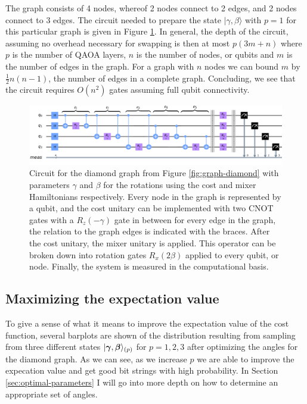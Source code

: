 The graph consists of 4 nodes, whereof 2 nodes connect to 2 edges, and 2 nodes connect to 3 edges. The circuit needed to prepare the state $|\gamma,\beta \rangle$ with $p=1$ for this particular graph is given in Figure \ref{fig:circuit}.
In general, the depth of the circuit, assuming no overhead necessary for swapping is then at most $p(3m+n)$ where $p$ is the number of QAOA layers, $n$ is the number of nodes, or qubits and $m$ is the number of edges in the graph. For a graph with $n$ nodes we can bound $m$ by $\frac{1}{2}n(n-1)$, the number of edges in a complete graph. Concluding, we see that the circuit requires $O(n^2)$ gates assuming full qubit connectivity. %

\begin{figure}[H]
	\includegraphics[width=\textwidth]{figures/circuit_diamond_edit2.png}
	\caption{Circuit for the diamond graph from Figure \ref{fig:graph-diamond} with parameters $\gamma$ and $\beta$ for the rotations using the cost and mixer Hamiltonians respectively. Every node in the graph is represented by a qubit, and the cost unitary can be implemented with two CNOT gates with a $R_z(-\gamma)$ gate in between for every edge in the graph, the relation to the graph edges is indicated with the braces. After the cost unitary, the mixer unitary is applied. This operator can be broken down into rotation gates $R_x(2\beta)$ applied to every qubit, or node. Finally, the system is measured in the computational basis.}
	\label{fig:circuit}
\end{figure}

\subsection{Maximizing the expectation value}
To give a sense of what it means to improve the expectation value of the cost function, several barplots are shown of the distribution resulting from sampling from three different states $|\bm{\gamma},\bm{\beta}\rangle_{(p)}$ for $p=1,2,3$ after optimizing the angles for the diamond graph. As we can see, as we increase $p$ we are able to improve the expecation value and get good bit strings with high probability. In Section \ref{sec:optimal-parameters} I will go into more depth on how to determine an appropriate set of angles.

